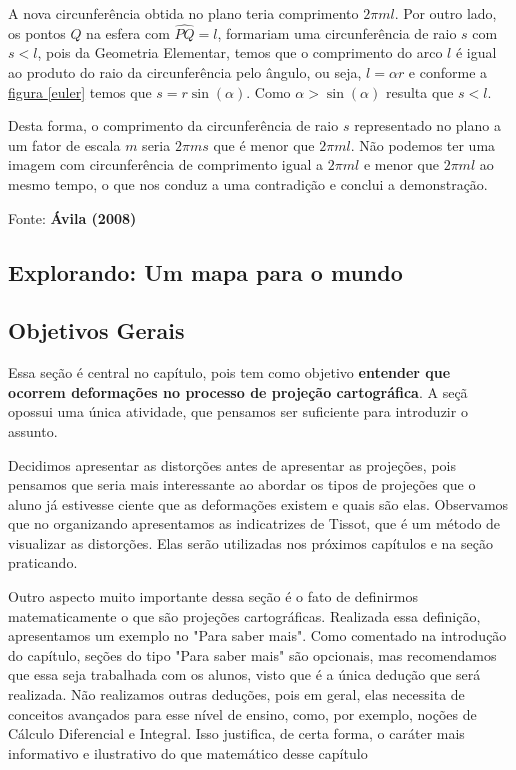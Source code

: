 A nova circunferência obtida no plano teria comprimento $2\pi 𝑚l$. Por outro lado, os pontos $Q$ na esfera com $ \widehat{PQ} = l$, formariam uma circunferência de raio $s$ com $s < l$, pois da Geometria Elementar, temos que o comprimento do arco $l$ é igual ao produto do raio da circunferência pelo ângulo, ou seja, $l = \alpha r$ e conforme a \hyperref[euler]{figura \ref{euler}} temos que $s =r \sin (\alpha)$. Como $\alpha > \sin(\alpha)$ resulta que $s < l$.

Desta forma, o comprimento da circunferência de raio $s$ representado no plano a um fator de escala $m$ seria $2\pi 𝑚𝑠$ que é menor que $2\pi 𝑚l$. Não podemos ter uma imagem com circunferência de comprimento igual a $2\pi 𝑚l$ e menor que $2\pi 𝑚l$ ao mesmo tempo, o que nos conduz a uma contradição e conclui a demonstração.

Fonte: \textbf{Ávila (2008)}

\cleardoublepage

\def\currentcolor{session1}
\begin{texto}
{
\section{Explorando: Um mapa para o mundo}

\subsection{Objetivos Gerais}

Essa seção é central no capítulo, pois tem como objetivo \textbf{entender que ocorrem deformações no processo de projeção cartográfica}. A seçã opossui uma única atividade, que pensamos ser suficiente para introduzir o assunto. 

Decidimos apresentar as distorções antes de apresentar as projeções, pois pensamos que seria mais interessante ao abordar os tipos de projeções que o aluno já estivesse ciente que as deformações existem e quais são elas. Observamos que no organizando apresentamos as indicatrizes de Tissot, que é um método de visualizar as distorções. Elas serão utilizadas nos próximos capítulos e na seção praticando.

Outro aspecto muito importante dessa seção é o fato de definirmos matematicamente o que são projeções cartográficas. Realizada essa definição, apresentamos um exemplo no "Para saber mais". Como comentado na introdução do capítulo, seções do tipo "Para saber mais"{} são opcionais, mas recomendamos que essa seja trabalhada com os alunos, visto que é a única dedução que será realizada. Não realizamos outras deduções, pois em geral, elas necessita de conceitos avançados para esse nível de ensino, como, por exemplo, noções de Cálculo Diferencial e Integral. Isso justifica, de certa forma, o caráter mais informativo e ilustrativo do que matemático desse capítulo
}
\end{texto}

